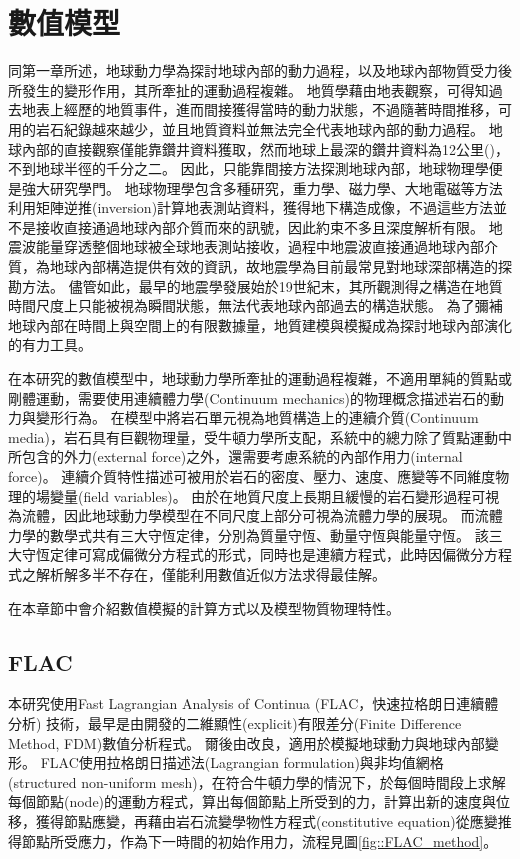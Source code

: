 
\chapter{數值模型}

同第一章所述，地球動力學為探討地球內部的動力過程，以及地球內部物質受力後所發生的變形作用，其所牽扯的運動過程複雜。
地質學藉由地表觀察，可得知過去地表上經歷的地質事件，進而間接獲得當時的動力狀態，不過隨著時間推移，可用的岩石紀錄越來越少，並且地質資料並無法完全代表地球內部的動力過程。
地球內部的直接觀察僅能靠鑽井資料獲取，然而地球上最深的鑽井資料為12公里(\citealp{ganchin1998seismic})，不到地球半徑的千分之二。
因此，只能靠間接方法探測地球內部，地球物理學便是強大研究學門。
地球物理學包含多種研究，重力學、磁力學、大地電磁等方法利用矩陣逆推(inversion)計算地表測站資料，獲得地下構造成像，不過這些方法並不是接收直接通過地球內部介質而來的訊號，因此約束不多且深度解析有限。
地震波能量穿透整個地球被全球地表測站接收，過程中地震波直接通過地球內部介質，為地球內部構造提供有效的資訊，故地震學為目前最常見對地球深部構造的探勘方法。
儘管如此，最早的地震學發展始於19世紀末，其所觀測得之構造在地質時間尺度上只能被視為瞬間狀態，無法代表地球內部過去的構造狀態。
為了彌補地球內部在時間上與空間上的有限數據量，地質建模與模擬成為探討地球內部演化的有力工具。

在本研究的數值模型中，地球動力學所牽扯的運動過程複雜，不適用單純的質點或剛體運動，需要使用連續體力學(Continuum mechanics)的物理概念描述岩石的動力與變形行為。
在模型中將岩石單元視為地質構造上的連續介質(Continuum media)，岩石具有巨觀物理量，受牛頓力學所支配，系統中的總力除了質點運動中所包含的外力(external force)之外，還需要考慮系統的內部作用力(internal force)。
連續介質特性描述可被用於岩石的密度、壓力、速度、應變等不同維度物理的場變量(field variables)。
由於在地質尺度上長期且緩慢的岩石變形過程可視為流體，因此地球動力學模型在不同尺度上部分可視為流體力學的展現。
而流體力學的數學式共有三大守恆定律，分別為質量守恆、動量守恆與能量守恆。
該三大守恆定律可寫成偏微分方程式的形式，同時也是連續方程式，此時因偏微分方程式之解析解多半不存在，僅能利用數值近似方法求得最佳解。

在本章節中會介紹數值模擬的計算方式以及模型物質物理特性。

\section{FLAC}

本研究使用Fast Lagrangian Analysis of Continua (FLAC，快速拉格朗日連續體分析) 技術，最早是由\citet{cundall1989numerical}開發的二維顯性(explicit)有限差分(Finite Difference Method, FDM)數值分析程式。
爾後由\citet{Lavier2000}改良，適用於模擬地球動力與地球內部變形。
FLAC使用拉格朗日描述法(Lagrangian formulation)與非均值網格(structured non-uniform mesh)，在符合牛頓力學的情況下，於每個時間段上求解每個節點(node)的運動方程式，算出每個節點上所受到的力，計算出新的速度與位移，獲得節點應變，再藉由岩石流變學物性方程式(constitutive equation)從應變推得節點所受應力，作為下一時間的初始作用力，流程見圖\ref{fig::FLAC_method}。

